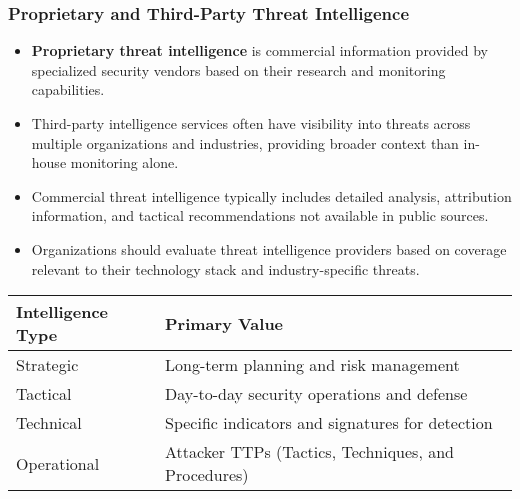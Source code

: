 \documentclass{beamer}
\begin{document}
\begin{frame}
\frametitle{Proprietary and Third-Party Threat Intelligence}
\begin{itemize}
\item \textbf{Proprietary threat intelligence} is commercial information provided by specialized security vendors based on their research and monitoring capabilities.
\item Third-party intelligence services often have visibility into threats across multiple organizations and industries, providing broader context than in-house monitoring alone.
\item Commercial threat intelligence typically includes detailed analysis, attribution information, and tactical recommendations not available in public sources.
\item Organizations should evaluate threat intelligence providers based on coverage relevant to their technology stack and industry-specific threats.
\end{itemize}

\begin{table}
\scriptsize
\centering
\begin{tabular}{p{4cm}p{7cm}}
\toprule
\textbf{Intelligence Type} & \textbf{Primary Value} \\
\midrule
Strategic & Long-term planning and risk management \\
Tactical & Day-to-day security operations and defense \\
Technical & Specific indicators and signatures for detection \\
Operational & Attacker TTPs (Tactics, Techniques, and Procedures) \\
\bottomrule
\end{tabular}
\end{table}
\end{frame}
\end{document}
